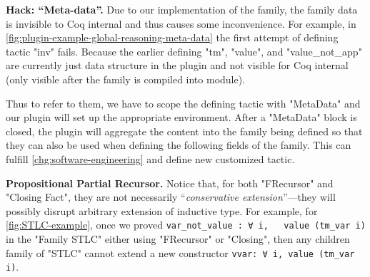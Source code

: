 \textbf{Hack: ``Meta-data''.} Due to our implementation of the family,
the family data is invisible to Coq internal and thus causes some
inconvenience. For example, in
\cref{fig:plugin-example-global-reasoning-meta-data} the first attempt
of defining tactic "inv" fails. Because the earlier defining "tm",
"value", and "value_not_app" are currently just data structure in the
plugin and not visible for Coq internal (only visible after the family
is compiled into module). 

Thus to refer to them, we have to scope the defining tactic with
"MetaData" and our plugin will set up the appropriate environment. After
a "MetaData" block is closed, the plugin will aggregate the content into
the family being defined so that they can also be used when defining
the following fields of the family.
This can fulfill \ref{chg:software-engineering} and define new customized tactic.








\textbf{Propositional Partial Recursor.} Notice that, for both "FRecursor" and "Closing Fact", they are not necessarily ``\textit{conservative extension}''---they will possibly disrupt arbitrary extension of inductive type. For example, for \cref{fig:STLC-example}, once we proved \texttt{var_not_value : ∀ i, ~ value (tm_var i)} in the "Family STLC" either using "FRecursor" or "Closing", then any children family of "STLC" cannot extend a new constructor \texttt{vvar: ∀ i, value (tm_var i)}. 

